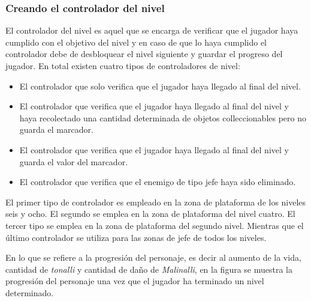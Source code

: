 \subsubsection{Creando el controlador del nivel}
El controlador del nivel es aquel que se encarga de verificar que el jugador 
haya cumplido con el objetivo del nivel y en caso de que lo haya cumplido el 
controlador debe de desbloquear el nivel siguiente y guardar el progreso del 
jugador. En total existen cuatro tipos de controladores de nivel:
\begin{itemize}
	\item El controlador que solo verifica que el jugador haya llegado al final 
	del nivel.
	\item El controlador que verifica que el jugador haya llegado al final del 
	nivel y haya recolectado una cantidad determinada de objetos colleccionables 
	pero no guarda el marcador.
	\item El controlador que verifica que el jugador haya llegado al final del 
	nivel y guarda el valor del marcador.
	\item El controlador que verifica que el enemigo de tipo jefe haya sido 
	eliminado.
\end{itemize} 

El primer tipo de controlador es empleado en la zona de plataforma de los 
niveles seis y ocho. El segundo se emplea en la zona de plataforma del nivel 
cuatro. El tercer tipo se emplea en la zona de plataforma del segundo nivel. 
Mientras que el último controlador se utiliza para las zonas de jefe de todos 
los niveles.
\\
\par
En lo que se refiere a la progresión del personaje, es decir al aumento de la 
vida, cantidad de \textit{tonalli} y cantidad de daño de \textit{Malinalli}, en 
la figura se muestra la progresión del personaje una vez que el jugador ha 
terminado un nivel determinado.


